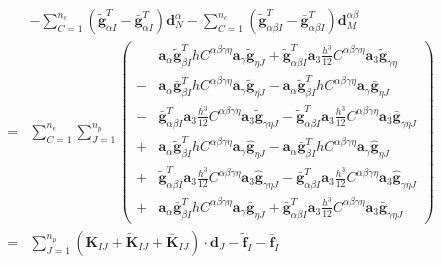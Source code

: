 \begin{equation}
\begin{split}
&- \sum_{C=1}^{n_c}(\tilde{\boldsymbol g}^T_{\alpha I} - \bar{\boldsymbol g}^T_{\alpha I}) \boldsymbol d_N^{\alpha}
- \sum_{C=1}^{n_c}(\tilde{\boldsymbol g}^T_{\alpha\beta I} - \bar{\boldsymbol g}^T_{\alpha\beta I}) \boldsymbol d_M^{\alpha\beta} \\
= &\sum_{C=1}^{n_e} \sum_{J=1}^{n_p} \left (
\begin{split}
& \boldsymbol a_\alpha \tilde{\boldsymbol g}^T_{\beta I} h C^{\alpha\beta\gamma\eta} \boldsymbol a_\gamma \tilde{\boldsymbol g}_{\eta J} 
+ \tilde{\boldsymbol g}^T_{\alpha\beta I} \boldsymbol a_3 \frac{h^3}{12}C^{\alpha\beta\gamma\eta} \boldsymbol a_3 \tilde{\boldsymbol g}_{\gamma\eta} \\
- & \boldsymbol a_\alpha \bar{\boldsymbol g}^T_{\beta I} h C^{\alpha\beta\gamma\eta} \boldsymbol a_\gamma \tilde{\boldsymbol g}_{\eta J} - \boldsymbol a_\alpha \tilde{\boldsymbol g}^T_{\beta I} h C^{\alpha\beta\gamma\eta} \boldsymbol a_\gamma \bar{\boldsymbol g}_{\eta J} \\
- & \bar{\boldsymbol g}^T_{\alpha\beta I}\boldsymbol a_3 \frac{h^3}{12} C^{\alpha\beta\gamma\eta} \boldsymbol a_3 \tilde{\boldsymbol g}_{\gamma\eta J} - \tilde{\boldsymbol g}^T_{\alpha\beta I} \boldsymbol a_3 \frac{h^3}{12} C^{\alpha\beta\gamma\eta} \boldsymbol a_3 \bar{\boldsymbol g}_{\gamma\eta J} \\
+ & \boldsymbol a_\alpha \tilde{\boldsymbol g}^T_{\beta I} h C^{\alpha\beta\gamma\eta} \boldsymbol a_\gamma \hat{\boldsymbol g}_{\eta J}
- \boldsymbol a_\alpha \bar{\boldsymbol g}^T_{\beta I} h C^{\alpha\beta\gamma\eta} \boldsymbol a_\gamma \hat{\boldsymbol g}_{\eta J} \\
+ & \tilde{\boldsymbol g}^T_{\alpha\beta I}\boldsymbol a_3 \frac{h^3}{12} C^{\alpha\beta\gamma\eta} \boldsymbol a_3 \hat{\boldsymbol g}_{\gamma\eta J} - \bar{\boldsymbol g}^T_{\alpha\beta I} \boldsymbol a_3 \frac{h^3}{12} C^{\alpha\beta\gamma\eta} \boldsymbol a_3 \hat{\boldsymbol g}_{\gamma\eta J} \\
+ & \boldsymbol a_\alpha \bar{\boldsymbol g}^T_{\beta I} h C^{\alpha\beta\gamma\eta} \boldsymbol a_\gamma \bar{\boldsymbol g}_{\eta J}
+ \bar{\boldsymbol g}^T_{\alpha\beta I}\boldsymbol a_3 \frac{h^3}{12} C^{\alpha\beta\gamma\eta} \boldsymbol a_3 \bar{\boldsymbol g}_{\gamma\eta J} 
\end{split}
\right ) \\
= &\sum_{J=1}^{n_p} (\boldsymbol K_{IJ}+\tilde{\boldsymbol K}_{IJ}+\bar{\boldsymbol K}_{IJ}) \cdot \boldsymbol d_J - \tilde{\boldsymbol f}_I - \bar{\boldsymbol f}_I
\end{split}
\end{equation}
